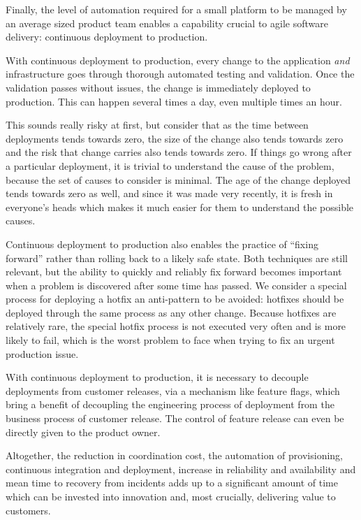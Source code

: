 \documentclass[reprint,amsmath,amssymb,aps]{revtex4-1}
\begin{document}
Finally, the level of automation required for a small platform to be managed by an average sized product team enables a capability crucial to agile software delivery: continuous deployment to production.

With continuous deployment to production, every change to the application \textit{and} infrastructure goes through thorough automated testing and validation. Once the validation passes without issues, the change is immediately deployed to production. This can happen several times a day, even multiple times an hour.

This sounds really risky at first, but consider that as the time between deployments tends towards zero, the size of the change also tends towards zero and the risk that change carries also tends towards zero. If things go wrong after a particular deployment, it is trivial to understand the cause of the problem, because the set of causes to consider is minimal. The age of the change deployed tends towards zero as well, and since it was made very recently, it is fresh in everyone's heads which makes it much easier for them to understand the possible causes.

Continuous deployment to production also enables the practice of “fixing forward” rather than rolling back to a likely safe state. Both techniques are still relevant, but the ability to quickly and reliably fix forward becomes important when a problem is discovered after some time has passed. We consider a special process for deploying a hotfix an anti-pattern to be avoided: hotfixes should be deployed through the same process as any other change. Because hotfixes are relatively rare, the special hotfix process is not executed very often and is more likely to fail, which is the worst problem to face when trying to fix an urgent production issue.

With continuous deployment to production, it is necessary to decouple deployments from customer releases, via a mechanism like feature flags, which bring a benefit of decoupling the engineering process of deployment from the business process of customer release. The control of feature release can even be directly given to the product owner.

Altogether, the reduction in coordination cost, the automation of provisioning, continuous integration and deployment, increase in reliability and availability and mean time to recovery from incidents adds up to a significant amount of time which can be invested into innovation and, most crucially, delivering value to customers.
\end{document}
